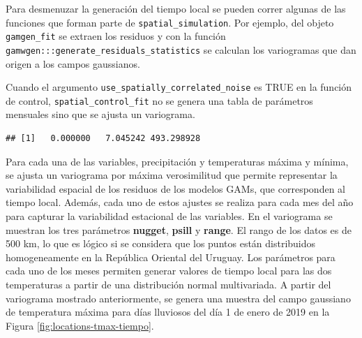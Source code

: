 \documentclass[
  12pt]{article}
\newenvironment{Shaded}{}{}
\newcommand{\CommentTok}[1]{\textcolor[rgb]{0.38,0.63,0.69}{\textit{#1}}}
\newcommand{\DataTypeTok}[1]{\textcolor[rgb]{0.56,0.13,0.00}{#1}}
\newcommand{\DecValTok}[1]{\textcolor[rgb]{0.25,0.63,0.44}{#1}}
\newcommand{\KeywordTok}[1]{\textcolor[rgb]{0.00,0.44,0.13}{\textbf{#1}}}
\newcommand{\NormalTok}[1]{#1}
\newcommand{\OperatorTok}[1]{\textcolor[rgb]{0.40,0.40,0.40}{#1}}
\newcommand{\StringTok}[1]{\textcolor[rgb]{0.25,0.44,0.63}{#1}}
\begin{document}
Para desmenuzar la generación del tiempo local se pueden correr algunas de las funciones que forman parte de \texttt{spatial\_simulation}. Por ejemplo, del objeto \texttt{gamgen\_fit} se extraen los residuos y con la función \texttt{gamwgen:::generate\_residuals\_statistics} se calculan los variogramas que dan origen a los campos gaussianos.

Cuando el argumento \texttt{use\_spatially\_correlated\_noise} es TRUE en la función de control, \texttt{spatial\_control\_fit} no se genera una tabla de parámetros mensuales sino que se ajusta un variograma.

\begin{Shaded}
\end{Shaded}

\begin{verbatim}
## [1]   0.000000   7.045242 493.298928
\end{verbatim}

Para cada una de las variables, precipitación y temperaturas máxima y mínima, se ajusta un variograma por máxima verosimilitud que permite representar la variabilidad espacial de los residuos de los modelos GAMs, que corresponden al tiempo local. Además, cada uno de estos ajustes se realiza para cada mes del año para capturar la variabilidad estacional de las variables. En el variograma se muestran los tres parámetros \textbf{nugget}, \textbf{psill} y \textbf{range}. El rango de los datos es de 500 km, lo que es lógico si se considera que los puntos están distribuidos homogeneamente en la República Oriental del Uruguay.
Los parámetros para cada uno de los meses permiten generar valores de tiempo local para las dos temperaturas a partir de una distribución normal multivariada.
A partir del variograma mostrado anteriormente, se genera una muestra del campo gaussiano de temperatura máxima para días lluviosos del día 1 de enero de 2019 en la Figura \ref{fig:locations-tmax-tiempo}.
\end{document}
